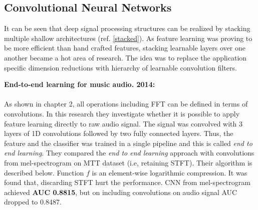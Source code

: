 \subsection{Convolutional Neural Networks}
\label{convolution}
It can be seen that deep signal processing structures can be realized by stacking multiple shallow architectures (ref. \ref{stacked}). As feature learning was proving to be more efficient than hand crafted features, stacking learnable layers over one another became a hot area of research.  The idea was to replace the application specific dimension reductions with hierarchy of learnable convolution filters. 
\bigskip

\noindent \textbf{End-to-end learning for music audio. 2014\cite{EndToEnd}:}\\
\\
\noindent As shown in chapter 2, all operations including FFT can be defined in terms of convolutions. In this research they investigate whether it is possible to apply feature learning directly to raw audio signal. The signal was convolved with 3 layers of 1D convolutions followed by two fully connected layers. Thus, the feature and the classifier was trained in a single pipeline and this is called\textit{ end to end learning}. They compared the \textit{end to end learning} approach with convolutions from mel-spectrogram on MTT dataset (i.e, retaining STFT). Their algorithm is described below. Function $f$ is an element-wise logarithmic compression. It was found that, discarding STFT hurt the performance. CNN from mel-spectrogram achieved \textbf{AUC 0.8815}, but on including convolutions on audio signal AUC dropped to 0.8487.     
 
